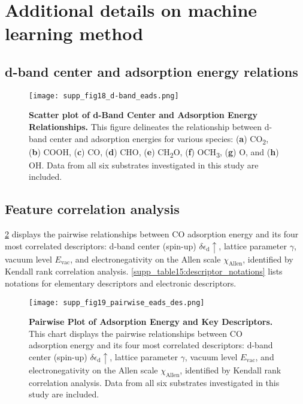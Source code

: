
\section{Additional details on machine learning method}

\subsection{d-band center and adsorption energy relations}
\label{supp_sec3.1_dband_eads}

\begin{figure}[htbp]
  \centering
  \texttt{[image: supp\_fig18\_d-band\_eads.png]}
  \caption{\textbf{Scatter plot of d-Band Center and Adsorption Energy Relationships.}
  This figure delineates the relationship between d-band center and adsorption energies for
  various species: (\textbf{a}) CO\textsubscript{2}, (\textbf{b}) COOH, (\textbf{c}) CO,
  (\textbf{d}) CHO, (\textbf{e}) CH\textsubscript{2}O, (\textbf{f}) OCH\textsubscript{3},
  (\textbf{g}) O, and (\textbf{h}) OH.
  Data from all six substrates investigated in this study are included.}
  \label{supp_fig18:dband_vs_eads}
\end{figure}

\subsection{Feature correlation analysis}
\label{supp_sec3.2_feature_corr}

\cref{supp_fig19:pairwise_eads_des} displays the pairwise relationships between CO adsorption energy
and its four most correlated descriptors: d-band center (spin-up) $\delta\epsilon_{\text{d}}\uparrow$,
lattice parameter $\gamma$, vacuum level $E_\text{vac}$, and electronegativity
on the Allen scale $\chi_\text{Allen}$, identified by Kendall rank correlation analysis.
\cref{supp_table15:descriptor_notations} lists notations for elementary descriptors and electronic descriptors.

\begin{figure}[htbp]
  \centering
  \texttt{[image: supp\_fig19\_pairwise\_eads\_des.png]}
  \caption{\textbf{Pairwise Plot of Adsorption Energy and Key Descriptors.}
  This chart displays the pairwise relationships between CO adsorption energy and
  its four most correlated descriptors: d-band center (spin-up) $\delta\epsilon_{\text{d}}\uparrow$,
  lattice parameter $\gamma$, vacuum level $E_\text{vac}$, and electronegativity
  on the Allen scale $\chi_\text{Allen}$, identified by Kendall rank correlation analysis.
  Data from all six substrates investigated in this study are included.}
  \label{supp_fig19:pairwise_eads_des}
\end{figure}

